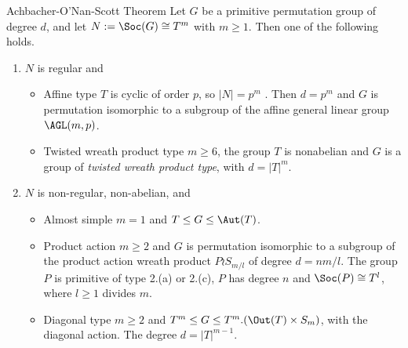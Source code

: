 \begin{frame}[fragile,label=OSTheorem]{Achbacher-O'Nan-Scott Theorem}
Let $G$ be a primitive permutation
group of degree $d$, and let $N := \Soc(G) \cong T^m$ with $m \geq 1$. 
Then one of the following holds.
\vskip2mm
\begin{enumerate}
\item 
$N$ is regular and
  \begin{itemize}
  \item 
  \alert{Affine type} $T$ is cyclic of order $p$, so $|N| = p^m$ . Then 
$d = p^m$ and $G$ is permutation isomorphic to a subgroup of the affine
general linear group $\AGL(m,p)$.
\vskip2mm
\item \alert{Twisted wreath product type} $m \geq 6$, the group $T$ is 
  nonabelian and $G$ is a group of \emph{twisted wreath product type}, with
  $d = |T|^m$.
  \end{itemize}
\vskip2mm
\item $N$ is non-regular, non-abelian, and
  \begin{itemize}
  \item 
\alert{Almost simple} $m = 1$ and $T \leq G \leq \Aut(T)$.
\vskip2mm
\item \alert{Product action} $m \geq 2$ and $G$ is permutation isomorphic to a
subgroup of the product action wreath product $P \wr S_{m/l}$ of degree
$d = nm/l$. The group $P$ is primitive of type 2.(a) or 2.(c), $P$ has
degree $n$ and $\Soc(P) \cong T^l$, where $l \geq 1$ divides $m$.
\vskip2mm
\item 
\alert{Diagonal type} $m \geq 2$ and $T^m \leq G \leq T^m . (\Out(T ) \times S_m)$, with
the diagonal action. The degree $d = |T|^{m-1}$.
  \end{itemize}
\end{enumerate}
\end{frame}


